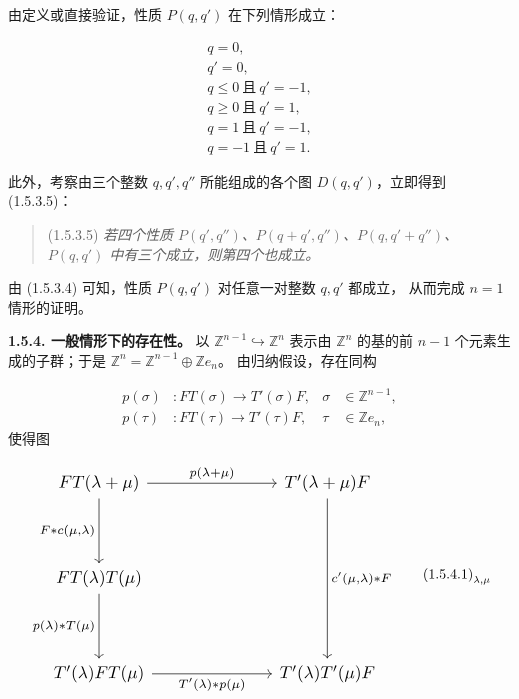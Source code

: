 \clearpage
{}%
由定义或直接验证，性质 $P(q,q')$ 在下列情形成立：

\begin{equation}
  \begin{gathered}
    q=0,\\
    q'=0,\\
    q\leq 0\ \text{且}\ q'=-1,\\
    q\geq 0\ \text{且}\ q'=1,\\
    q=1\ \text{且}\ q'=-1,\\
    q=-1\ \text{且}\ q'=1.
  \end{gathered}
  \tag{1.5.3.4}
\end{equation}

此外，考察由三个整数 $q,q',q''$ 所能组成的各个图 $D(q,q')$，立即得到
(1.5.3.5)：

\begin{quote}
  \noindent\textup{(1.5.3.5)}\quad
  \emph{若四个性质
  $P(q',q'')$、$P(q+q',q'')$、$P(q,q'+q'')$、$P(q,q')$
  中有三个成立，则第四个也成立。}
\end{quote}

由 (1.5.3.4) 可知，性质 $P(q,q')$ 对任意一对整数 $q,q'$ 都成立，
从而完成 $n=1$ 情形的证明。

\noindent\textbf{1.5.4. 一般情形下的存在性。}\quad
以 $\mathbb Z^{n-1}\hookrightarrow\mathbb Z^n$ 表示由
$\mathbb Z^n$ 的基的前 $n-1$ 个元素生成的子群；于是
$\mathbb Z^n=\mathbb Z^{n-1}\oplus\mathbb Z e_n$。
由归纳假设，存在同构

\[
  \begin{aligned}
    p(\sigma)&\colon FT(\sigma)\longrightarrow T'(\sigma)F,
      &\sigma&\in\mathbb Z^{n-1},\\
    p(\tau)&\colon FT(\tau)\longrightarrow T'(\tau)F,
      &\tau&\in\mathbb Z e_n,
  \end{aligned}
\]
使得图

\begin{equation}
  \resizebox{0.76\textwidth}{!}{%
    $\begin{tikzcd}[ampersand replacement=\&,column sep=7.0em,row sep=3.8em]
      FT(\lambda+\mu)
        \arrow[r,"{p(\lambda+\mu)}"]
        \arrow[d,"{F*c(\mu,\lambda)}"']
        \& T'(\lambda+\mu)F
        \arrow[dd,"{c'(\mu,\lambda)*F}"] \\
      FT(\lambda)T(\mu)
        \arrow[d,"{p(\lambda)*T(\mu)}"']
        \& {} \\
      T'(\lambda)FT(\mu)
        \arrow[r,"{T'(\lambda)*p(\mu)}"']
        \& T'(\lambda)T'(\mu)F
    \end{tikzcd}$%
  }
  \tag*{\(\textup{(1.5.4.1)}_{\lambda,\mu}\)}
\end{equation}
